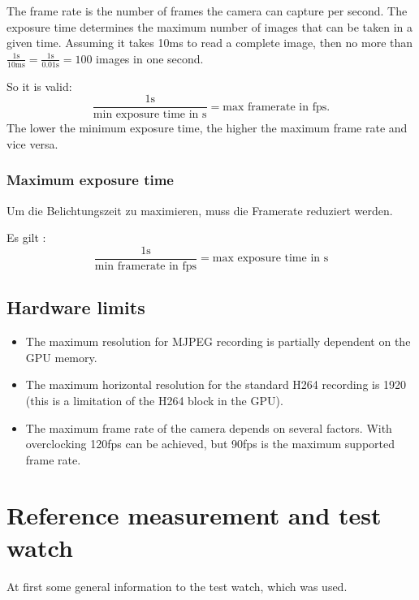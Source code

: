 \documentclass[12pt, a4paper]{report}
\begin{document}
    The frame rate is the number of frames the camera can capture per second. The exposure time determines the maximum number of images that can be taken in a given time. Assuming it takes 10ms to read a complete image, then no more than $\frac{1 \text{s} }{10 \text{ms}} = \frac{1\text{s}}{0.01\text{s}} = 100 $ images in one second. 
    
    \bigskip
    
    So it is valid: 
    \begin{displaymath}
    \frac{1\text{s}}{\text{min exposure time in s}} = \text{max framerate in
    fps.} 
    \end{displaymath}
    The lower the minimum exposure time, the higher the maximum frame rate and vice versa.
    
    \subsubsection{Maximum exposure time}
    Um die Belichtungszeit zu maximieren, muss die Framerate reduziert werden. 
    
    Es gilt :
    \begin{displaymath}
    \frac{1\text{s}}{\text{min framerate in fps}} = \text{max exposure time
    in s}
    \end{displaymath} 
    
    \subsection{Hardware limits}
    
    \begin{itemize}
    \item The maximum resolution for MJPEG recording is partially dependent on the GPU memory.
    \item The maximum horizontal resolution for the standard H264 recording is 1920 (this is a limitation of the H264 block in the GPU).
    \item The maximum frame rate of the camera depends on several factors. With overclocking 120fps can be achieved, but 90fps is the maximum supported frame rate.
    
    \end{itemize}
    
    
    \section{Reference measurement and test watch}
    At first some general information to the test watch, which was used.
    
\end{document}
